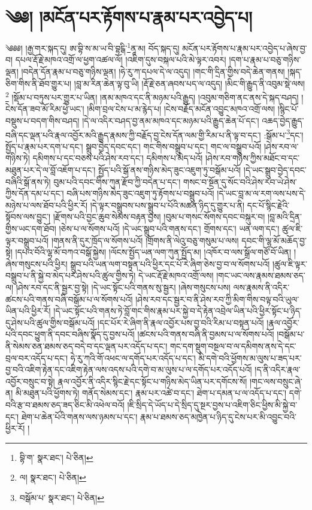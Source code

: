 \setcounter{footnote}{0} 
\chapter{༄༅། །མངོན་པར་རྟོགས་པ་རྣམ་པར་འབྱེད་པ།}༄༅༅། །རྒྱ་གར་སྐད་དུ། ཨ་བྷི་ས་མ་ཡ་བི་བྷངྒི་\footnote{བྷི་ག་  སྣར་ཐང་།  པེ་ཅིན། }ནཱ་མ། བོད་སྐད་དུ། མངོན་པར་རྟོགས་པ་རྣམ་པར་འབྱེད་པ་ཞེས་བྱ་བ། དཔལ་རྡོ་རྗེ་མཁའ་འགྲོ་ལ་ཕྱག་འཚལ་ལོ། །འཇིག་དུས་བསྐལ་པའི་མེ་ལྟར་འབར། །དག་པ་རྣམ་པ་བཅུ་གཉིས་ལྡན། །བདེན་དོན་རྣམ་པ་བཅུ་གཉིས་ལྡན། །ཧེ་རུ་ཀ་དཔལ་དེ་ལ་འདུད། །གང་གི་དྲིན་གྱིས་བདེ་ཆེན་གནས། །སྐད་ཅིག་གིས་ནི་ཐོབ་གྱུར་པ། །བླ་མ་རིན་ཆེན་ལྟ་བུ་ཡི། །རྡོ་རྗེ་ཅན་ཞབས་པད་ལ་འདུད། །མིང་གི་རྒྱུད་ནི་འབུམ་སྡེ་ལས།\footnote{ལ།  སྣར་ཐང་།  པེ་ཅིན། } །སྡོམ་པ་བཏུས་པར་གྱུར་པ་ཡིན། །ནམ་མཁའ་དང་ནི་མཉམ་པའི་རྒྱུད། །འབུམ་གཅིག་ནང་ནས་དེ་སྐད་བཤད། །ངེས་དོན་ཟབ་མོ་རིམ་ཕྱེ་ཡང་། །མིག་བྲལ་ངེས་པ་མ་རྙེད་པ། །ངེས་བརྗོད་མངོན་འབྱུང་མཁའ་འགྲོ་ལས། །སྙིང་པོ་བསྡུས་པ་བདག་གིས་བཤད། །དེ་ལ་འདིར་བཤད་བྱ་ནམ་མཁའ་དང་མཉམ་པའི་རྒྱུད་ཆེན་པོ་དང་། འཆད་བྱེད་རྒྱུད་བཞི་དང་ལྡན་པའི་རྣལ་འབྱོར་མའི་རྒྱུད་རྣམས་ཀྱི་བརྗོད་བྱ་ངེས་དོན་ལམ་གྱི་རིམ་པ་ནི་ལྟ་བ་དང་། :སྒོམ་པ་\footnote{བསྒོམ་པ་  སྣར་ཐང་།  པེ་ཅིན། }དང་། སྤྱོད་པ་རྣམ་པར་དག་པ་དང་། སྒྲུབ་བྱེད་དབང་དང་། གང་གིས་བསྒྲུབ་པ་དང་། གང་ལ་བསྒྲུབ་པའོ། །ཤེས་རབ་ལ་གཉིས་ཏེ། དམིགས་པ་དང་བཅས་པའི་ཤེས་རབ་དང་། དམིགས་པ་མེད་པའོ། །ཤེས་རབ་གཉིས་ཀྱིས་མཐོང་བ་དང་མཐུན་པར་དེ་ལ་བློ་འཇོག་པ་དང་། སྤྱོད་པའི་སྒོ་ནས་གཉིས་མེད་ཟུང་འཇུག་ཏུ་བསྒོམ་པའོ། །དེ་ཡང་སྒྲུབ་བྱེད་དབང་བཞིའི་སྒོ་ནས་ཏེ། བུམ་པའི་དབང་གིས་ཀུན་རྫོབ་ཀྱི་བདེན་པ་དང་། གསང་བ་སྔོན་དུ་སོང་བའི་ཤེས་རབ་ཡེ་ཤེས་ཀྱིས་དོན་དམ་པ་དང་། བཞི་པས་གཉིས་མེད་ཟུང་འཇུག་ཏུ་རྟོགས་པ་བསྒྲུབ་པའོ། །དེ་ཡང་བླ་མ་ལ་རག་ལས་པས་དེ་མཉེས་པ་ལས་ཐོབ་པའི་ཕྱིར་རོ། །དེ་ལྟར་བསྒྲུབས་པས་སྒྲུབ་པ་པོའི་མཚན་ཉིད་དུ་གྱུར་པ་ནི། དང་པོ་སྙིང་རྗེའི་སྟོབས་ལས་བྱུང་། །རྫོགས་པའི་བྱང་ཆུབ་སེམས་བརྟན་བྱས། །བུམ་པ་གསང་སོགས་དབང་བསྐུར་བ། །བླ་མའི་དྲིན་གྱིས་ཡང་དག་ཐོབ། །ཅེས་པ་ལ་སོགས་པའོ། །དེ་ཡང་སྒྲུབ་པའི་གནས་དང་། གྲོགས་དང་། ཡན་ལག་དང་། ཚུལ་ཇི་ལྟར་བསྒྲུབ་པའོ། །གནས་ནི་དུར་ཁྲོད་ལ་སོགས་པའོ། །གྲོགས་ནི་ལེའུ་བཅུ་གསུམ་པ་ལས། དབང་གི་ལྷ་མོ་མཆོད་བྱ་སྟེ། །དཔའ་བོའི་ལྷ་མོ་བཀའ་བསྒོ་སྐྱེས། །ལོངས་སྤྱོད་ཡན་ལག་ཀུན་སྤྱོད་མ། །འཁོར་བ་ལས་སྒྲོལ་གཙོ་བོ་ཡིན། །ཞེས་གསུངས་པའི་ཕྱིར། སྒྲུབ་པའི་ཡན་ལག་བསྟན་པའི་ཕྱིར་དང་པོ་རེ་ཞིག་ཅེས་བྱ་བ་ལ་སོགས་པའོ། །ཚུལ་ཇི་ལྟར་བསྒྲུབ་པ་ནི་སྐྱེ་བ་མེད་པར་ཤེས་པའི་ཚུལ་གྱིས་ཏེ། དེ་ཡང་རྡོ་རྗེ་མཁའ་འགྲོ་ལས། །གང་ཡང་ལས་རྣམས་ཐམས་ཅད་ལ། །ཤེས་རབ་དང་ནི་སྦྱར་བྱ་སྟེ། །དེ་ཡང་སྟོང་པའི་གནས་སུ་སྦྱར། །ཞེས་གསུངས་པས། ལས་རྣམས་ནི་འདིར་ཚངས་པའི་གནས་བཞི་བསྒོམ་པ་ལ་སོགས་པའོ། །ཤེས་རབ་དང་སྦྱར་བ་ནི་ཤེས་རབ་ཀྱི་མིག་གིས་བལྟ་བའི་ཡུལ་ཡིན་པའི་ཕྱིར་རོ། །དེ་ཡང་སྟོང་པའི་གནས་ཏེ་བློ་གང་གིས་རྣམ་པར་སྐྱེ་བ་དེ་རྟེན་འབྲེལ་ཡིན་པའི་ཕྱིར་སྟོང་པ་ཉིད་དུ་ཤེས་པའི་ཚུལ་གྱིས་བསྒོམ་པའོ། །དང་པོར་རེ་ཞིག་ནི་རྣལ་འབྱོར་པས་བྱ་བའི་རིམ་པ་བསྟན་པའོ། །རྣལ་འབྱོར་པའི་དབང་ཕྱུག་ནི་དབང་བཞིས་སྣོད་དུ་བྱས་པའོ། །ཚངས་པའི་གནས་བཞི་ནི་བྱམས་པ་ལ་སོགས་པའོ། །བསྒོམ་པ་ནི་སེམས་ཅན་ཐམས་ཅད་བདེ་བ་དང་ལྡན་པར་འདོད་པ་དང་། གང་དག་སྡུག་བསྔལ་བ་ལ་དམིགས་ནས་དེ་དང་བྲལ་བར་འདོད་པ་དང་། ཧེ་རུ་ཀའི་གོ་འཕང་ལ་དགོད་པར་འདོད་པ་དང་། མི་དགེ་བའི་ཕྱོགས་མ་ལུས་པ་ཟད་པར་བྱ་བའི་འཇིག་རྟེན་དང་འཇིག་རྟེན་ལས་འདས་པའི་དགེ་བ་མ་ལུས་པ་ལ་དགོད་པར་འདོད་པའོ། །ད་ནི་འདིར་རྣལ་འབྱོར་བསྲུང་བ་སྟེ། རྣལ་འབྱོར་ནི་འདིར་སྙིང་རྗེ་དང་སྟོང་པ་གཉིས་མེད་ཡིན་པར་དགོངས་སོ། །གང་ལས་བསྲུང་ཞེ་ན། མི་མཐུན་པའི་ཕྱོགས་ཏེ། གནོད་སེམས་དང་། རྣམ་པར་འཚེ་བ་དང་། ཐེག་པ་དམན་པ་ལ་འདོད་པ་དང་། དགེ་བའི་རྩ་བ་ཐམས་ཅད་ཟད་ཅིང་མི་འཕེལ་བའོ། །ཇི་སྲིད་དེ་ཡོད་པ་དེ་སྲིད་དུ་སྔར་བྱས་པ་འཇིག་ཅིང་ཕྱིས་མི་སྐྱེ་བ་དང་། ཐེག་པ་ཆེན་པོའི་གནས་ལས་ཉམས་པ་དང་། རྣམ་པ་ཐམས་ཅད་མཁྱེན་པ་ཉིད་དུ་ངེས་པར་མི་འབྱུང་བའི་ཕྱིར་རོ། །
